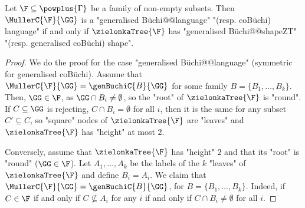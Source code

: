 \documentclass[10pt,a4paper]{amsart}
\begin{document}
\begin{proposition}\label{prop-app:genBuchi-shape-ZT}
		Let $\F\subseteq \powplus{\Gamma}$ be a family of non-empty subsets. Then $\MullerC{\F}{\GG}$ is a "generalised B\"uchi@@language" "(resp. coB\"uchi) language" if and only if $\zielonkaTree{\F}$ has "generalised B\"uchi@@shapeZT" "(resp. generalised coB\"uchi) shape".
\end{proposition}
\begin{proof}
	We do the proof for the case "generalised B\"uchi@@language" (symmetric for generalised coB\"uchi).
	Assume that $\MullerC{\F}{\GG} =\genBuchiC{B}{\GG}$  for some family $B=\{B_1,\dots,B_k\}$. Then, $\GG\in \F$, as $\GG\cap B_i \neq \emptyset$, so the "root" of $\zielonkaTree{\F}$ is "round". If $C\subseteq \GG$ is rejecting, $C\cap B_i =\emptyset$ for all $i$, then it is the same for any subset $C'\subseteq C$, so "square" nodes of $\zielonkaTree{\F}$ are "leaves" and $\zielonkaTree{\F}$ has "height" at most $2$.
	
	Conversely, assume that $\zielonkaTree{\F}$ has "height" $2$ and that its "root" is "round" ($\GG\in \F$). Let $A_1,\dots, A_k$ be the labels of the $k$ "leaves" of $\zielonkaTree{\F}$ and define $B_i = A_i$. We claim that $\MullerC{\F}{\GG} =\genBuchiC{B}{\GG}$, for $B=\{B_1,\dots,B_k\}$. Indeed, if $C\in \F$ if and only if $C\nsubseteq A_i$  for any $i$ if and only if $C\cap B_i \neq \emptyset$ for all $i$.
\end{proof}
\end{document}
